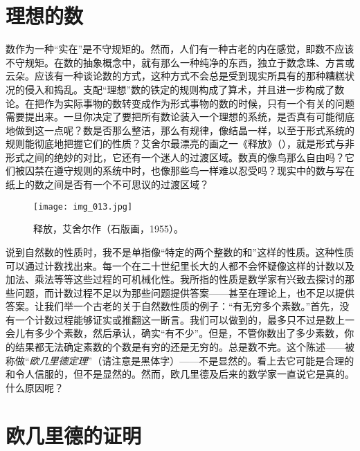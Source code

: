 \section{理想的数}

数作为一种“实在”是不守规矩的。然而，人们有一种古老的内在感觉，即数不应该不守规矩。在数的抽象概念中，就有那么一种纯净的东西，独立于数念珠、方言或云朵。应该有一种谈论数的方式，这种方式不会总是受到现实所具有的那种糟糕状况的侵入和捣乱。支配“理想”数的铁定的规则构成了算术，并且进一步构成了数论。在把作为实际事物的数转变成作为形式事物的数的时候，只有一个有关的问题需要提出来。一旦你决定了要把所有数论装入一个理想的系统，是否真有可能彻底地做到这一点呢？数是否那么整洁，那么有规律，像结晶一样，以至于形式系统的规则能彻底地把握它们的性质？艾舍尔最漂亮的画之一《释放》（），就是形式与非形式之间的绝妙的对比，它还有一个迷人的过渡区域。数真的像鸟那么自由吗？它们被囚禁在遵守规则的系统中时，也像那些鸟一样难以忍受吗？现实中的数与写在纸上的数之间是否有一个不可思议的过渡区域？

\begin{figure}
\texttt{[image: img\_013.jpg]}
\caption[释放，艾舍尔作。]
  {释放，艾舍尔作（石版画，1955）。}
\end{figure}

说到自然数的性质时，我不是单指像“特定的两个整数的和”这样的性质。这种性质可以通过计数找出来。每一个在二十世纪里长大的人都不会怀疑像这样的计数以及加法、乘法等等这些过程的可机械化性。我所指的性质是数学家有兴致去探讨的那些问题，而计数过程不足以为那些问题提供答案——甚至在理论上，也不足以提供答案。让我们举一个古老的关于自然数性质的例子：“有无穷多个素数。”首先，没有一个计数过程能够证实或推翻这一断言。我们可以做到的，最多只不过是数上一会儿有多少个素数，然后承认，确实“有不少”。但是，不管你数出了多少素数，你的结果都无法确定素数的个数是有穷的还是无穷的。总是数不完。这个陈述——被称做“\emph{欧几里德定理}”（请注意是黑体字）——不是显然的。看上去它可能是合理的和令人信服的，但不是显然的。然而，欧几里德及后来的数学家一直说它是真的。什么原因呢？

\section{欧几里德的证明}

